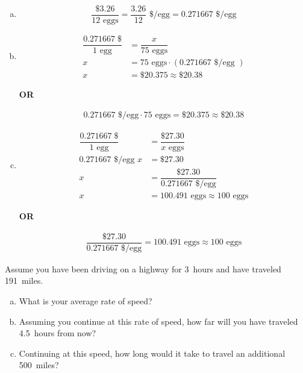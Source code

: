 \documentclass[11pt,letterpaper]{article}
\begin{document}
\sol
\begin{enumerate}[(a)]
\item 
	\[
	\dfrac{\$3.26}{12 \text{ eggs}}= \dfrac{3.26}{12} \text{ \$/egg}= 0.271667 \text{ \$/egg}
	\] \pspace

\item 
	\[
	\begin{aligned}
	\dfrac{0.271667\; \$}{1 \text{ egg}}&= \dfrac{x}{75 \text{ eggs}} \\[0.3cm]
	x&= 75 \text{ eggs} \cdot (0.271667 \text{ \$/egg }) \\[0.3cm]
	x&= \$20.375 \approx \$20.38
	\end{aligned}
	\]
	
	\begin{center} {\bfseries OR} \end{center}
	\[
	\begin{aligned}
	0.271667 \text{ \$/egg} \cdot 75 \text{ eggs}= \$20.375 \approx \$20.38
	\end{aligned}
	\] \pspace

\item 
	\[
	\begin{aligned}
	\dfrac{0.271667\; \$}{1 \text{ egg}}&= \dfrac{\$27.30}{x \text{ eggs}} \\[0.3cm]
	0.271667 \text{ \$/egg } x&= \$27.30 \\[0.3cm]
	x&= \dfrac{\$27.30}{0.271667 \text{ \$/egg}} \\[0.3cm]
	x&= 100.491 \text{ eggs} \approx 100 \text{ eggs}
	\end{aligned}
	\]
	
	\begin{center} {\bfseries OR} \end{center}
	\[
	\begin{aligned}
	\dfrac{\$27.30}{0.271667 \text{ \$/egg}}= 100.491 \text{ eggs} \approx 100 \text{ eggs}
	\end{aligned}
	\] \pspace
\end{enumerate}



\newpage



 Assume you have been driving on a highway for 3~hours and have traveled 191~miles.
\begin{enumerate}[(a)]
\item What is your average rate of speed?
\item Assuming you continue at this rate of speed, how far will you have traveled 4.5~hours from now?
\item Continuing at this speed, how long would it take to travel an additional 500~miles?
\end{enumerate} \pspace
\end{document}

